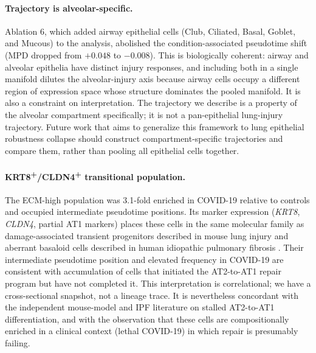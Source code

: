 \documentclass[11pt]{article}
\begin{document}
\paragraph{Trajectory is alveolar-specific.} Ablation 6, which added airway epithelial cells (Club, Ciliated, Basal, Goblet, and Mucous) to the analysis, abolished the condition-associated pseudotime shift (MPD dropped from $+0.048$ to $-0.008$). This is biologically coherent: airway and alveolar epithelia have distinct injury responses, and including both in a single manifold dilutes the alveolar-injury axis because airway cells occupy a different region of expression space whose structure dominates the pooled manifold. It is also a constraint on interpretation. The trajectory we describe is a property of the alveolar compartment specifically; it is not a pan-epithelial lung-injury trajectory. Future work that aims to generalize this framework to lung epithelial robustness collapse should construct compartment-specific trajectories and compare them, rather than pooling all epithelial cells together.

\paragraph{KRT8\textsuperscript{+}/CLDN4\textsuperscript{+} transitional population.} The ECM-high population was 3.1-fold enriched in COVID-19 relative to controls and occupied intermediate pseudotime positions. Its marker expression (\textit{KRT8}, \textit{CLDN4}, partial AT1 markers) places these cells in the same molecular family as damage-associated transient progenitors described in mouse lung injury \citep{Kobayashi2020, Strunz2020} and aberrant basaloid cells described in human idiopathic pulmonary fibrosis \citep{Adams2020, Habermann2020}. Their intermediate pseudotime position and elevated frequency in COVID-19 are consistent with accumulation of cells that initiated the AT2-to-AT1 repair program but have not completed it. This interpretation is correlational; we have a cross-sectional snapshot, not a lineage trace. It is nevertheless concordant with the independent mouse-model and IPF literature on stalled AT2-to-AT1 differentiation, and with the observation that these cells are compositionally enriched in a clinical context (lethal COVID-19) in which repair is presumably failing.
\end{document}
